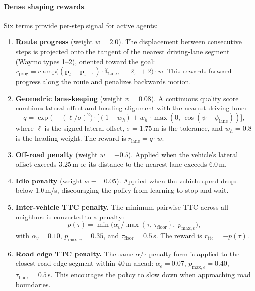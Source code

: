 \paragraph{Dense shaping rewards.}
Six terms provide per-step signal for active agents:
\begin{enumerate}[leftmargin=*, itemsep=1pt]
  \item \textbf{Route progress} (weight $w = 2.0$).
  The displacement between consecutive steps is projected onto the tangent of the nearest driving-lane segment (Waymo types 1--2), oriented toward the goal:
  $r_{\mathrm{prog}} = \mathrm{clamp}\bigl((\mathbf{p}_t - \mathbf{p}_{t-1}) \cdot \hat{\mathbf{t}}_{\mathrm{lane}},\; -2,\; +2\bigr) \cdot w$.
  This rewards forward progress along the route and penalizes backwards motion.

  \item \textbf{Geometric lane-keeping} (weight $w = 0.08$).
  A continuous quality score combines lateral offset and heading alignment with the nearest driving lane:
  \[
    q = \exp\!\bigl(-(\ell / \sigma)^2\bigr) \cdot \bigl[(1 - w_h) + w_h \cdot \max(0,\, \cos(\psi - \psi_{\mathrm{lane}}))\bigr],
  \]
  where $\ell$ is the signed lateral offset, $\sigma = 1.75$\,m is the tolerance, and $w_h = 0.8$ is the heading weight.
  The reward is $r_{\mathrm{lane}} = q \cdot w$.

  \item \textbf{Off-road penalty} (weight $w = -0.5$).
  Applied when the vehicle's lateral offset exceeds 3.25\,m or its distance to the nearest lane exceeds 6.0\,m.

  \item \textbf{Idle penalty} (weight $w = -0.05$).
  Applied when the vehicle speed drops below 1.0\,m/s, discouraging the policy from learning to stop and wait.

  \item \textbf{Inter-vehicle TTC penalty.}
  The minimum pairwise TTC across all neighbors is converted to a penalty:
  \[
    p(\tau) = \min\!\bigl(\alpha_v / \max(\tau,\, \tau_{\mathrm{floor}}),\; p_{\mathrm{max},v}\bigr),
  \]
  with $\alpha_v = 0.10$, $p_{\mathrm{max},v} = 0.35$, and $\tau_{\mathrm{floor}} = 0.5$\,s.
  The reward is $r_{\mathrm{ttc}} = -p(\tau)$.

  \item \textbf{Road-edge TTC penalty.}
  The same $\alpha/\tau$ penalty form is applied to the closest road-edge segment within 40\,m ahead:
  $\alpha_e = 0.07$, $p_{\mathrm{max},e} = 0.40$, $\tau_{\mathrm{floor}} = 0.5$\,s.
  This encourages the policy to slow down when approaching road boundaries.
\end{enumerate}

